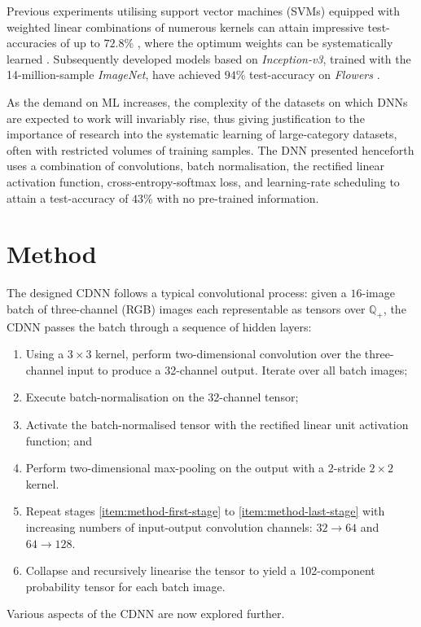 \documentclass[journal]{IEEEtran}
\newcommand\networkperformance{43}
\begin{document}
Previous experiments utilising support vector machines (SVMs) equipped with
weighted linear combinations of numerous kernels can attain impressive
test-accuracies of up to $72.8$\% \cite{Nilsback:2008}, where the optimum
weights can be systematically learned \cite{Varma:2007}. Subsequently developed
models based on \emph{Inception-v3}, trained with the 14-million-sample
\emph{ImageNet}, have achieved $94$\% test-accuracy on \emph{Flowers}
\cite{Xia:2017}.

As the demand on ML increases, the complexity of the datasets on which DNNs are
expected to work will invariably rise, thus giving justification to the
importance of research into the systematic learning of large-category datasets,
often with restricted volumes of training samples.  The DNN presented henceforth
uses a combination of convolutions, batch normalisation, the rectified linear
activation function, cross-entropy-softmax loss, and learning-rate scheduling to
attain a test-accuracy of $\networkperformance$\% with no pre-trained
information.

\section{Method}
The designed CDNN follows a typical convolutional process: given a $16$-image
batch of three-channel (RGB) images each representable as tensors over
$\mathbb{Q}_+$, the CDNN passes the batch through a sequence of hidden layers:
\begin{enumerate}
    \item Using a $3 \times 3$ kernel, perform two-dimensional convolution over
        the three-channel input to produce a 32-channel output. Iterate
        over all batch images; \label{item:method-first-stage}
    \item Execute batch-normalisation on the 32-channel tensor;
    \item Activate the batch-normalised tensor with the rectified linear unit
        activation function; and
    \item Perform two-dimensional max-pooling on the output with a $2$-stride $2
        \times 2$ kernel. \label{item:method-last-stage}
    \item Repeat stages \ref{item:method-first-stage} to
        \ref{item:method-last-stage} with increasing numbers of input-output
        convolution channels: $32 \to 64$ and $64 \to 128$.
    \item Collapse and recursively linearise the tensor to yield a
        102-component probability tensor for each batch image.
\end{enumerate}
Various aspects of the CDNN are now explored further.
\end{document}
